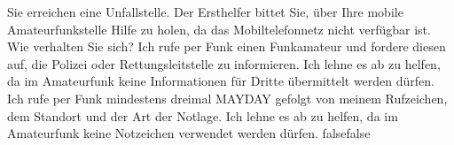     {Sie erreichen eine Unfallstelle. Der Ersthelfer bittet Sie, über Ihre mobile Amateurfunkstelle Hilfe zu holen, da das Mobiltelefonnetz nicht verfügbar ist. Wie verhalten Sie sich?}
    {Ich rufe per Funk einen Funkamateur und fordere diesen auf, die Polizei oder Rettungsleitstelle zu informieren.}
    {Ich lehne es ab zu helfen, da im Amateurfunk keine Informationen für Dritte übermittelt werden dürfen.}
    {Ich rufe per Funk mindestens dreimal MAYDAY gefolgt von meinem Rufzeichen, dem Standort und der Art der Notlage.}
    {Ich lehne es ab zu helfen, da im Amateurfunk keine Notzeichen verwendet werden dürfen.}
    {false}{false}
